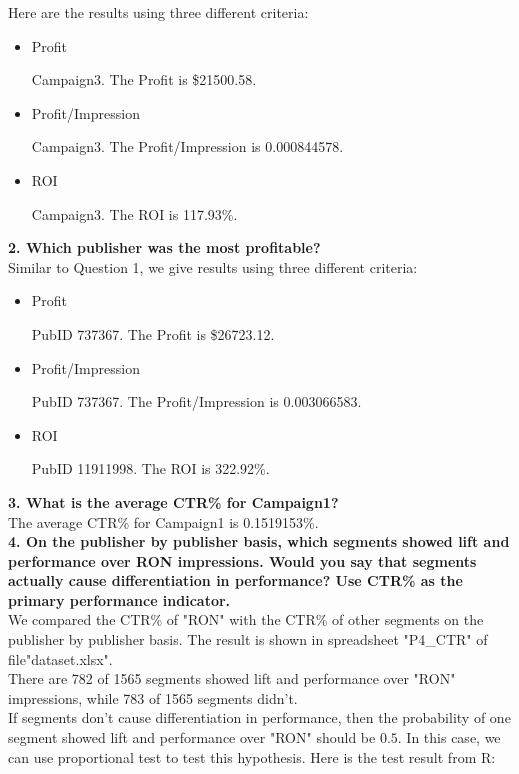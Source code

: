 \documentclass[12pt]{article}
\begin{document}
Here are the results using three different criteria:

\begin{itemize}
  \item Profit

	Campaign3. The Profit is \$21500.58.
  \item Profit/Impression

	Campaign3. The Profit/Impression is 0.000844578.
  \item ROI

	Campaign3. The ROI is 117.93\%.
\end{itemize}

{\bf 2. Which publisher was the most profitable?} \\

Similar to Question 1, we give results using three different criteria:

\begin{itemize}
  \item Profit

	PubID 737367. The Profit is \$26723.12.
  \item Profit/Impression

	PubID 737367. The Profit/Impression is 0.003066583.
  \item ROI

	PubID 11911998. The ROI is 322.92\%.
\end{itemize}

{\bf 3. What is the average CTR\% for Campaign1?} \\

The average CTR\% for Campaign1 is 0.1519153\%. \\

{\bf 4. On the publisher by publisher basis, which segments showed lift and performance over RON impressions. Would you say that segments actually cause differentiation in performance? Use CTR\% as the primary performance indicator.} \\

We compared the CTR\% of "RON" with the CTR\% of other segments on the publisher by publisher basis. The result is shown in spreadsheet "P4\_CTR" of file"dataset.xlsx". \\

There are 782 of 1565 segments showed lift and performance over "RON" impressions, while 783 of 1565 segments didn't. \\

If segments don't cause differentiation in performance, then the probability of one segment showed lift and performance over "RON" should be $0.5$. In this case, we can use proportional test to test this hypothesis. Here is the test result from R:
\end{document}

